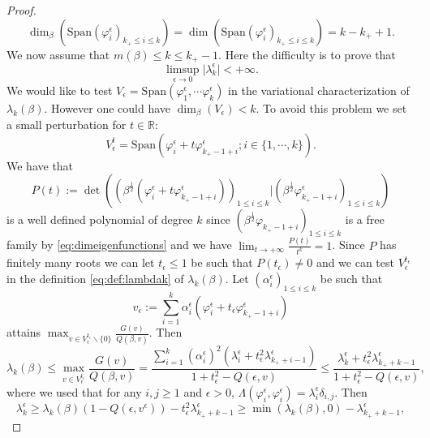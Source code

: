\documentclass[10pt]{amsart}
\numberwithin{equation}{section}
\newcommand{\R}{\mathbb{R}}
\def\ep{{\varepsilon}}
\newcommand{\vp}{\varphi}
\def \ep{\epsilon}
\theoremstyle{plain}
\theoremstyle{remark}
\begin{document}
\begin{proof}
\begin{equation} \label{eq:dimeigenfunctions}\dim_\beta\left(\text{Span} \left( \vp_i^\ep \right)_{k_+ \leq  i \leq k} \right) = \dim\left(\text{Span} \left( \vp_i^\ep \right)_{k_+ \leq  i \leq k} \right) = k-k_++1. \end{equation}
We now assume that $m(\beta) \leq k\leq k_+-1$. Here the difficulty is to prove that
\begin{equation} \label{eq:provelimsup} \limsup_{\ep\to 0} \vert \lambda_k^\ep \vert < + \infty. \end{equation}
We would like to test $V_\ep = \text{Span}\left(\vp_1^\ep ,\cdots \vp_k^\ep\right)$ in the variational characterization of $\lambda_k(\beta)$. However one could have $\dim_\beta \left( V_\ep\right) < k$. To avoid this problem we set a small perturbation for $t \in \R$:
$$ V_\ep^t =  \text{Span}\left(\vp_i^\ep + t \vp_{k_+ -1 +i}^\ep ; i \in \{1,\cdots,k\} \right). $$
We have that 
$$P(t) := \det\left( \left(\beta^{\frac{1}{2}} \left(\vp_i^\ep + t \vp_{k_+ -1 +i}^\ep \right) \right)_{1\leq i \leq k} \vert \left(\beta^{\frac{1}{2}}\vp_{k_+ -1 + i}^\ep\right)_{1\leq i \leq k} \right)$$
is a well defined polynomial of degree $k$ since $\left(\beta^{\frac{1}{2}}\vp_{k_+ -1 + i}\right)_{1\leq i \leq k}$ is a free family by \eqref{eq:dimeigenfunctions} and we have $\lim_{t\to +\infty} \frac{P(t)}{t^k} = 1$. Since $P$ has finitely many roots we can let $t _\ep \leq 1$ be such that $P(t_\ep)\neq 0$ and we can test $V_\ep^{t_\ep}$ in the definition  \eqref{eq:def:lambdak}  of $\lambda_k(\beta)$.  Let $(\alpha_i^{\ep})_{1 \le i \le k}$ be such that 
$$ v_{\ep}:=  \sum_{i=1}^k \alpha_i^\ep \left(\vp_i^\ep + t_\ep \vp_{k_+ -1 +i}^\ep\right)$$
attains $\max_{v \in V_\ep^{t_\ep} \backslash \{0\}} \frac{G(v)}{Q(\beta,v)} $. Then 
$$ \lambda_k(\beta) \leq \max_{v \in V_\ep^{t_\ep}} \frac{G(v)}{Q(\beta,v)} = \frac{\sum_{i=1}^k \left(\alpha_i^\ep\right)^2\left( \lambda_i^\ep + t_\ep^2 \lambda_{k_+ +i-1}^\ep \right) }{ 1 + t_\ep^2 - Q(\ep,v)} \leq  \frac{\lambda_k^\ep + t_\ep^2 \lambda_{k_+ +k-1}^\ep  }{ 1 + t_\ep^2 - Q(\ep,v)} , $$
where we used that for any $i,j\geq 1$ and $\ep >0$, $\Lambda(\vp_i^\ep,\vp_i^\ep) = \lambda_i^\ep \delta_{i,j}$. Then
$$\lambda_k^\ep \geq \lambda_k(\beta)\left( 1-Q(\ep,v^{\ep}) \right) - t_{\ep}^2 \lambda_{k_++k-1}^\ep \geq \min\left(\lambda_k(\beta),0\right) - \lambda_{k_++k-1}^\ep, $$

\end{proof}
\end{document}
